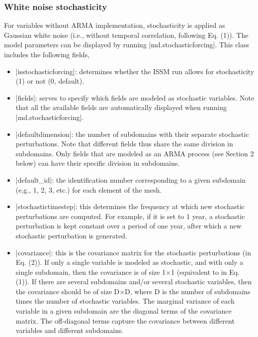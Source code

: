\subsubsection{White noise stochasticity}
For variables without ARMA implementation, stochasticity is applied as Gaussian white noise (i.e., without temporal correlation, following Eq. (1)). The model parameters can be displayed by running \lstinlinebg|md.stochasticforcing|. This class includes the following fields,
\begin{itemize}
	\item \lstinlinebg|isstochasticforcing|: determines whether the ISSM run allows for stochasticity (1) or not (0, default).
	\item \lstinlinebg|fields|: serves to specify which fields are modeled as stochastic variables. Note that all the available fields are automatically displayed when running \lstinlinebg|md.stochasticforcing|.
	\item \lstinlinebg|defaultdimension|: the number of subdomains with their separate stochastic perturbations. Note that different fields thus share the same division in subdomains. Only fields that are modeled as an ARMA process (see Section 2 below) can have their specific division in subdomains.
	\item \lstinlinebg|default_id|: the identification number corresponding to a given subdomain (e.g., 1, 2, 3, etc.) for each element of the mesh.
		\item \lstinlinebg|stochastictimestep|: this determines the frequency at which new stochastic perturbations are computed. For example, if it is set to 1 year, a stochastic perturbation is kept constant over a period of one year, after which a new stochastic perturbation is generated.
		\item \lstinlinebg|covariance|: this is the covariance matrix for the stochastic perturbations (in Eq. (2)). If only a single variable is modeled as stochastic, and with only a single subdomain, then the covariance is of size 1×1 (equivalent to in Eq. (1)). If there are several subdomains and/or several stochastic variables, then the covariance should be of size D×D, where D is the number of subdomains times the number of stochastic variables. The marginal variance of each variable in a given subdomain are the diagonal terms of the covariance matrix. The off-diagonal terms capture the covariance between different variables and different subdomains.
\end{itemize}


